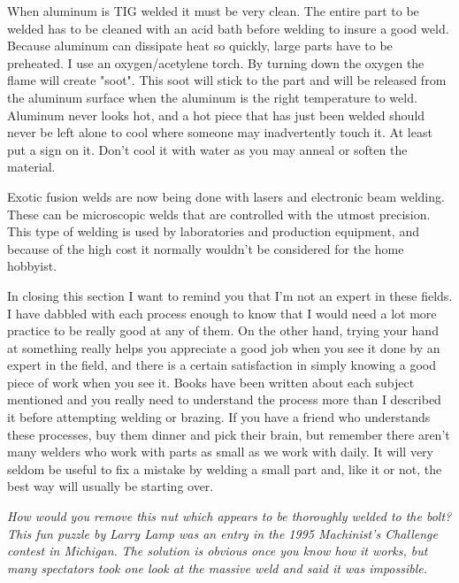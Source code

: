 
When aluminum is TIG welded it must be very clean. The entire part to be welded
has to be cleaned with an acid bath before welding to insure a good weld.
Because aluminum can dissipate heat so quickly, large parts have to be
preheated. I use an oxygen/acetylene torch. By turning down the oxygen the flame
will create "soot". This soot will stick to the part and will be released from
the aluminum surface when the aluminum is the right temperature to weld.
Aluminum never looks hot, and a hot piece that has just been welded should never
be left alone to cool where someone may inadvertently touch it. At least put a
sign on it. Don't cool it with water as you may anneal or soften the material.


Exotic fusion welds are now being done with lasers and electronic beam welding.
These can be microscopic welds that are controlled with the utmost precision.
This type of welding is used by laboratories and production equipment, and
because of the high cost it normally wouldn't be considered for the home
hobbyist.


In closing this section I want to remind you that I'm not an expert in these
fields. I have dabbled with each process enough to know that I would need a
lot more practice to be really good at any of them. On the other hand, trying
your hand at something really helps you appreciate a good job when you see it
done by an expert in the field, and there is a certain satisfaction in simply
knowing a good piece of work when you see it. Books have been written about each
subject mentioned and you really need to understand the process more than I
described it before attempting welding or brazing. If you have a friend who
understands these processes, buy them dinner and pick their brain, but remember
there aren't many welders who work with parts as small as we work with daily. It
will very seldom be useful to fix a mistake by welding a small part and, like it
or not, the best way will usually be starting over.

\bigskip
\textit{How would you remove this nut which appears to be thoroughly welded to
the bolt? This fun puzzle by Larry Lamp was an entry in the 1995 Machinist's
Challenge contest in Michigan.}
\bigskip
\textit{The solution is obvious once you know how it works, but many spectators
took one look at the massive weld and said it was impossible.}
\bigskip

